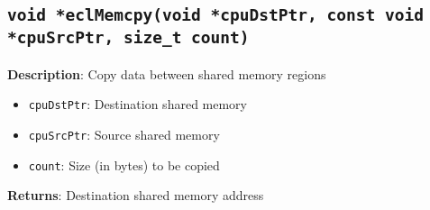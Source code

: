 \subsection{\texttt{void *eclMemcpy(void *cpuDstPtr, const void *cpuSrcPtr, size\_t count)}}

\textbf{Description}: Copy data between shared memory regions
\begin{itemize}
  \item \texttt{cpuDstPtr}: Destination shared memory
  \item \texttt{cpuSrcPtr}: Source shared memory
  \item \texttt{count}: Size (in bytes) to be copied
\end{itemize}
\textbf{Returns}: Destination shared memory address

%
%
%
%
%
%
%

